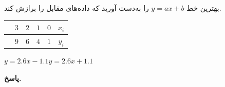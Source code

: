  بهترین خط 
 \(y=ax+b\)
 را به‌دست آورید که داده‌های مقابل را برازش کند.
 \vspace*{-.2cm}
	\begin{tabular}{ccccc|c}
		 & \(3\) &\(2\)&\(1\) & \(0\) & \(x_i\)\\
		\midrule
		& \(9\) & \(6\) & \(4\) &\( 1\) & \(y_i\)
	\end{tabular}
 {\(y=2.6x-1.1\)}{\(y=2.6x + 1.1\)}
\begin{answer}

	\textbf{پاسخ.}
	
\end{answer}
